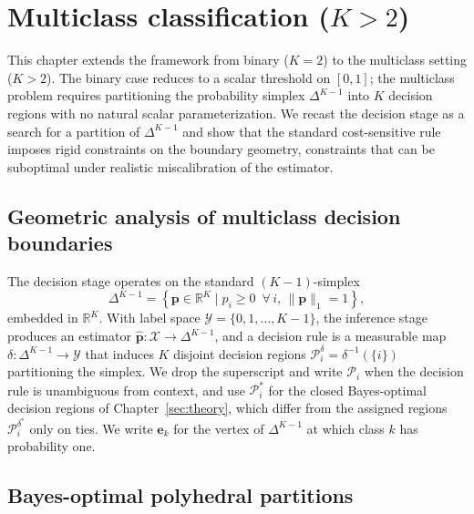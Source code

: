 \chapter{Multiclass classification ($K > 2$)}\label{sec:multiclass}

This chapter extends the framework from binary ($K=2$) to the multiclass setting ($K > 2$). The binary case reduces to a scalar threshold on $[0, 1]$; the multiclass problem requires partitioning the probability simplex $\Delta^{K-1}$ into $K$ decision regions with no natural scalar parameterization. We recast the decision stage as a search for a partition of $\Delta^{K-1}$ and show that the standard cost-sensitive rule imposes rigid constraints on the boundary geometry, constraints that can be suboptimal under realistic miscalibration of the estimator.

\section{Geometric analysis of multiclass decision boundaries}\label{sec:geometry}

The decision stage operates on the standard $(K-1)$-simplex
\begin{equation}
    \Delta^{K-1} = \left\{ \mathbf{p} \in \mathbb{R}^K \mid p_i \geq 0 \,\,\, \forall\, i, \, \|\mathbf{p}\|_1 = 1 \right\},
\end{equation}
embedded in $\mathbb{R}^K$. With label space $\mathcal{Y} = \{0, 1, \ldots, K-1\}$, the inference stage produces an estimator $\hat{\mathbf{p}}: \mathcal{X} \to \Delta^{K-1}$, and a decision rule is a measurable map $\delta: \Delta^{K-1} \to \mathcal{Y}$ that induces $K$ disjoint decision regions $\mathcal{P}_i^\delta = \delta^{-1}(\{i\})$ partitioning the simplex. We drop the superscript and write $\mathcal{P}_i$ when the decision rule is unambiguous from context, and use $\mathcal{P}_i^*$ for the closed Bayes-optimal decision regions of Chapter~\ref{sec:theory}, which differ from the assigned regions $\mathcal{P}_i^{\delta^*}$ only on ties. We write $\mathbf{e}_k$ for the vertex of $\Delta^{K-1}$ at which class $k$ has probability one.

\section{Bayes-optimal polyhedral partitions}

